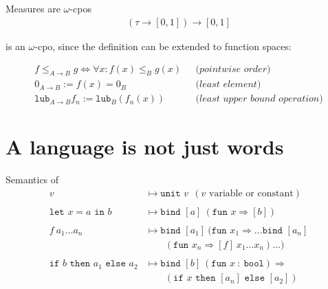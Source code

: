 \documentclass{beamer}
\begin{document}

\begin{frame}{Measures are $\omega$-cpos}
  \begin{align*}
    (\tau\to[0,1])\to[0,1]
  \end{align*}
  \pause
  \begin{center}
    is an $\omega$-cpo, since the definition can be extended to function spaces: 
  \end{center}
  \pause
  \begin{align*}
    f\leq_{A \to B} g \Leftrightarrow \forall x: f(x) \leq_B g(x)
    & ~~~\textit{(pointwise order)}\\
    0_{A\to B} := f(x) = 0_B
    & ~~~\textit{(least element)}\\
    \texttt{lub}_{A\to B} f_n := \texttt{lub}_B(f_n(x))
    & ~~~\textit{(least upper bound operation)}
  \end{align*}
\end{frame}


\section{A language is not just words}


\begin{frame}{Semantics of \rml}
  \begin{align*}
    v
    &\mapsto \texttt{unit }v ~~ (v \text{ variable or constant})\\ \\
    \texttt{let }x=a\texttt{ in } b
    &\mapsto \texttt{bind }[a]~(\texttt{fun } x \Rightarrow [b])\\ \\
    f~a_1\dots a_n
    &\mapsto \texttt{bind }[a_1]~(\texttt{fun } x_1 \Rightarrow \dots \texttt{bind }[a_n]
    \\ 
    &\hspace{2em} (\texttt{fun } x_n \Rightarrow [f]~x_1 \dots x_n) \dots ) \\\\
    \texttt{if $b$ then $a_1$ else $a_2$}
    &\mapsto  \texttt{bind } [b]~(\texttt{fun } x~:~\texttt{bool}) \Rightarrow\\
    &\hspace{2em} (\texttt{if $x$ then $[a_n]$ else $[a_2]$})
  \end{align*}
\end{frame}
\end{document}

